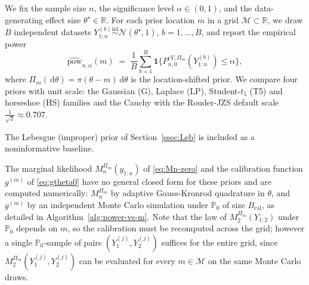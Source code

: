 \documentclass[numsec,webpdf,modern,medium,namedate]{oup-authoring-template}
\theoremstyle{thmstyleone}%
\theoremstyle{thmstyletwo}%
\theoremstyle{thmstylethree}%
\newcommand{\Prob}{\mathbb{P}}
\newcommand{\dd}{\,\mathrm{d}}
\newcommand{\1}{\mathbf{1}}
\begin{document}
We fix the sample size \(n\), the significance level
\(\alpha\in(0,1)\), and the data-generating effect size
\(\theta^\star\in\mathbb{R}\). For each prior location \(m\) in a grid
\(\mathcal M\subset\mathbb{R}\), we draw \(B\) independent datasets
\(Y_{1:n}^{(b)}\stackrel{\mathrm{iid}}{\sim}\mathcal
N(\theta^\star,1)\), \(b=1,\ldots,B\), and report the empirical power
\begin{equation}\label{eq:power-def}
   \widehat{\mathrm{pow}}_{n,\alpha}(m)
   \;=\;\frac{1}{B}\sum_{b=1}^B
       \mathbf 1\!\bigl\{P_{n,0}^{eV,\Pi_m}(Y_{1:n}^{(b)})\leq\alpha\bigr\},
\end{equation}
where \(\Pi_m(\dd\theta)=\pi(\theta-m)\dd\theta\) is the
location-shifted prior. We compare four priors with unit scale: the Gaussian (G), Laplace (LP), Student-\(t_5\) (T5) and horseshoe (HS) families and the Cauchy with the Rouder-JZS default scale $\frac{1}{\sqrt{2}} \approx 0.707$.


The Lebesgue (improper) prior of
Section~\ref{ssec:Leb} is included as a noninformative baseline.

The marginal likelihood \(M_n^{\Pi_m}(y_{1:n})\) of \eqref{eq:Mn-zero} and the calibration function \(g^{(m)}\) of \eqref{eq:gtheta0} have no general closed form for these priors and are computed numerically: \(M_n^{\Pi_m}\) by adaptive Gauss-Kronrod quadrature \citep{piessens2012quadpack} in \(\theta\), and \(g^{(m)}\) by an independent Monte Carlo simulation under \(\Prob_0\) of size
\(B_{\mathrm{cal}}\), as detailed in Algorithm~\ref{alg:power-vs-m}. Note that the law of \(M_2^{\Pi_m}(Y_{1:2})\) under \(\Prob_0\) depends on \(m\), so the calibration must be recomputed across the grid; however a single \(\Prob_0\)-sample of pairs \((Y_1^{(j)},Y_2^{(j)})\) suffices for the entire grid, since \(M_2^{\Pi_m}(Y_1^{(j)},Y_2^{(j)})\) can be evaluated for every \(m\in\mathcal M\) on the same Monte Carlo draws.
\end{document}
